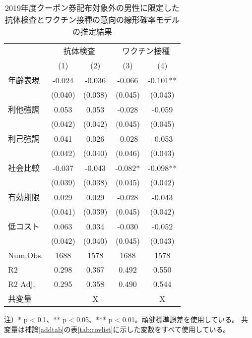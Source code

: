 \documentclass[
  11pt,
  a4paper,
]{article}
\begin{document}
\begin{table}

\caption{\label{tab:show-int-coupon0-reg}2019年度クーポン券配布対象外の男性に限定した 抗体検査とワクチン接種の意向の線形確率モデルの推定結果}
\centering
\begin{threeparttable}
\begin{tabular}[t]{lcccc}
\toprule
\multicolumn{1}{c}{ } & \multicolumn{2}{c}{抗体検査} & \multicolumn{2}{c}{ワクチン接種} \\
\cmidrule(l{3pt}r{3pt}){2-3} \cmidrule(l{3pt}r{3pt}){4-5}
  & (1) & (2) & (3) & (4)\\
\midrule
年齢表現 & -0.024 & -0.036 & -0.066 & -0.101**\\
 & (0.040) & (0.038) & (0.045) & (0.043)\\
利他強調 & 0.053 & 0.053 & -0.028 & -0.059\\
 & (0.042) & (0.042) & (0.045) & (0.045)\\
利己強調 & 0.041 & 0.026 & -0.028 & -0.053\\
 & (0.042) & (0.040) & (0.046) & (0.043)\\
社会比較 & -0.037 & -0.043 & -0.082* & -0.098**\\
 & (0.039) & (0.038) & (0.045) & (0.042)\\
有効期限 & 0.029 & 0.029 & -0.028 & -0.043\\
 & (0.041) & (0.039) & (0.045) & (0.042)\\
低コスト & 0.063 & 0.034 & -0.030 & -0.052\\
 & (0.042) & (0.040) & (0.045) & (0.043)\\
\midrule
Num.Obs. & 1688 & 1578 & 1688 & 1578\\
R2 & 0.298 & 0.367 & 0.492 & 0.550\\
R2 Adj. & 0.295 & 0.358 & 0.490 & 0.544\\
共変量 &  & X &  & X\\
\bottomrule
\end{tabular}
\begin{tablenotes}
\item 注）* p < 0.1、** p < 0.05、*** p < 0.01。頑健標準誤差を使用している。 共変量は補論\ref{addtab}の表\ref{tab:covlist}に示した変数をすべて使用している。
\end{tablenotes}
\end{threeparttable}
\end{table}
\end{document}
